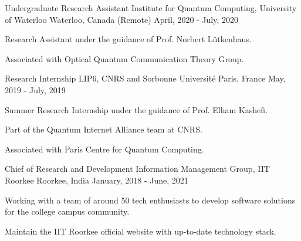 \begin{cventries}
  \cventry
    {Undergraduate Research Assistant} %
    {Institute for Quantum Computing, University of Waterloo} %
    {Waterloo, Canada (Remote)} %
    {April, 2020 - July, 2020} %
    {
      \begin{cvitems} %
        \item {Research Assistant under the guidance of Prof. Norbert Lütkenhaus.}
        \item {Associated with Optical Quantum Communication Theory Group.}
      \end{cvitems}
    }

  \cventry
    {Research Internship} %
    {LIP6, CNRS and Sorbonne Université} %
    {Paris, France} %
    {May, 2019 - July, 2019} %
    {
      \begin{cvitems} %
        \item {Summer Research Internship under the guidance of Prof. Elham Kashefi.}
        \item {Part of the Quantum Internet Alliance team at CNRS.}
        \item {Associated with Paris Centre for Quantum Computing.}
      \end{cvitems}
    }

  \cventry
    {Chief of Research and Development} %
    {Information Management Group, IIT Roorkee} %
    {Roorkee, India} %
    {January, 2018 - June, 2021} %
    {
      \begin{cvitems} %
        \item {Working with a team of around 50 tech enthusiasts to develop software solutions for the college campus community.}
        \item {Maintain the IIT Roorkee official website with up-to-date technology stack.}
      \end{cvitems}
    }

\end{cventries}